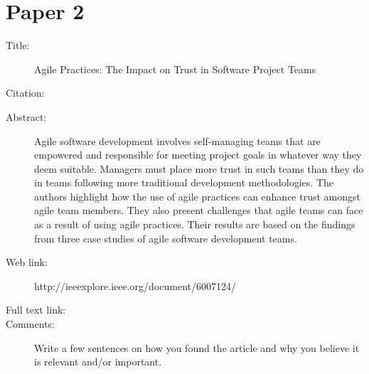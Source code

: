 \documentclass{scrartcl}
\begin{document}
\section*{Paper 2}
\begin{description}
\item[Title:] Agile Practices: The Impact on Trust in Software Project Teams
\item[Citation:] \cite{Paper2}
\item[Abstract:] {Agile software development involves self-managing teams that are empowered and responsible for meeting project goals in whatever way they deem suitable. Managers must place more trust in such teams than they do in teams following more traditional development methodologies. The authors highlight how the use of agile practices can enhance trust amongst agile team members. They also present challenges that agile teams can face as a result of using agile practices. Their results are based on the findings from three case studies of agile software development teams.}
\item[Web link:] {http://ieeexplore.ieee.org/document/6007124/}
\item[Full text link:] {}
\item[Comments:] Write a few sentences on how you found the article and why you believe it is relevant and/or important.
\end{description}
\end{document}
